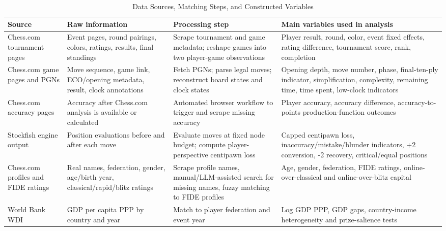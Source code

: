 \begin{table}[H]
\centering
\caption{Data Sources, Matching Steps, and Constructed Variables}
\label{tab:data-source-map}
\small
\begin{adjustbox}{max width=\textwidth}
\begin{tabular}{p{} p{} p{} p{}}
\toprule
Source & Raw information & Processing step & Main variables used in analysis \\
\midrule
Chess.com tournament pages & Event pages, round pairings, colors, ratings, results, final standings & Scrape tournament and game metadata; reshape games into two player-game observations & Player result, round, color, event fixed effects, rating difference, tournament score, rank, completion \\
Chess.com game pages and PGNs & Move sequence, game link, ECO/opening metadata, result, clock annotations & Fetch PGNs; parse legal moves; reconstruct board states and clock states & Opening depth, move number, phase, final-ten-ply indicator, simplification, complexity, remaining time, time spent, low-clock indicators \\
Chess.com accuracy pages & Accuracy after Chess.com analysis is available or calculated & Automated browser workflow to trigger and scrape missing accuracy & Player accuracy, accuracy difference, accuracy-to-points production-function outcomes \\
Stockfish engine output & Position evaluations before and after each move & Evaluate moves at fixed node budget; compute player-perspective centipawn loss & Capped centipawn loss, inaccuracy/mistake/blunder indicators, +2 conversion, -2 recovery, critical/equal positions \\
Chess.com profiles and FIDE ratings & Real names, federation, gender, age/birth year, classical/rapid/blitz ratings & Scrape profile names, manual/LLM-assisted search for missing names, fuzzy matching to FIDE profiles & Age, gender, federation, FIDE ratings, online-over-classical and online-over-blitz capital \\
World Bank WDI & GDP per capita PPP by country and year & Match to player federation and event year & Log GDP PPP, GDP gaps, country-income heterogeneity and prize-salience tests \\
\bottomrule
\end{tabular}
\end{adjustbox}
\end{table}
